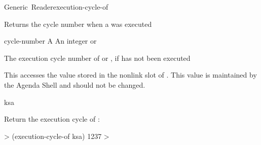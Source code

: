 \documentclass[10pt,twoside,english,pdftex]{article}
\begin{document}
\begin{functiondoc}{Generic~Reader}{execution-cycle-of}{ 
    \returns{} }
%
%

\fnsyntax

\fnpurpose Returns the cycle number when a  was executed

\fnmethods
{}

\fnpackage {}

\fnmodule {}

\fnargs
\begin{args}{cycle-number}
\arg[ksa] A 
 An integer or \nil{}
\end{args}

\fnreturns The execution cycle number of  or \nil, if  has
not been executed
  
\fndescription 
This  accesses the value stored in the 
 nonlink slot of . This value is
maintained by the Agenda Shell and should not be changed.

\begin{alsos}{ksa}
\also[ksa]
\end{alsos}

\fnexample
Return the execution cycle of :
%
\W\supp
\begin{example}
  > (execution-cycle-of ksa)
  1237
  >
\end{example}

\end{functiondoc}

 
\end{document}
